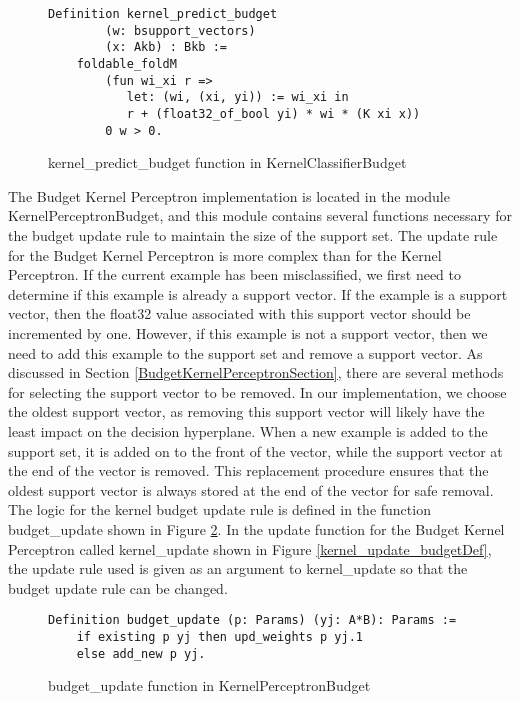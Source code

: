 \begin{figure}
    \caption{kernel\_predict\_budget function in KernelClassifierBudget}
    \label{kernel_predict_budgetDef}
    \begin{lstlisting}
Definition kernel_predict_budget
        (w: bsupport_vectors)
        (x: Akb) : Bkb :=
    foldable_foldM
        (fun wi_xi r =>
           let: (wi, (xi, yi)) := wi_xi in 
           r + (float32_of_bool yi) * wi * (K xi x))
        0 w > 0.
    \end{lstlisting}
\end{figure}

The Budget Kernel Perceptron implementation is located in the module KernelPerceptronBudget, and this module contains several functions necessary for the budget update rule to maintain the size of the support set. The update rule for the Budget Kernel Perceptron is more complex than for the Kernel Perceptron. If the current example has been misclassified, we first need to determine if this example is already a support vector. If the example is a support vector, then the float32 value associated with this support vector should be incremented by one. However, if this example is not a support vector, then we need to add this example to the support set and remove a support vector. As discussed in Section \ref{BudgetKernelPerceptronSection}, there are several methods for selecting the support vector to be removed. In our implementation, we choose the oldest support vector, as removing this support vector will likely have the least impact on the decision hyperplane. When a new example is added to the support set, it is added on to the front of the vector, while the support vector at the end of the vector is removed. This replacement procedure ensures that the oldest support vector is always stored at the end of the vector for safe removal. The logic for the kernel budget update rule is defined in the function budget\_update shown in Figure \ref{budget_updateDef}. In the update function for the Budget Kernel Perceptron called kernel\_update shown in Figure \ref{kernel_update_budgetDef}, the update rule used is given as an argument to kernel\_update so that the budget update rule can be changed. 

\begin{figure}
    \caption{budget\_update function in KernelPerceptronBudget}
    \label{budget_updateDef}
    \begin{lstlisting}
Definition budget_update (p: Params) (yj: A*B): Params :=
    if existing p yj then upd_weights p yj.1
    else add_new p yj.
    \end{lstlisting}
\end{figure}


